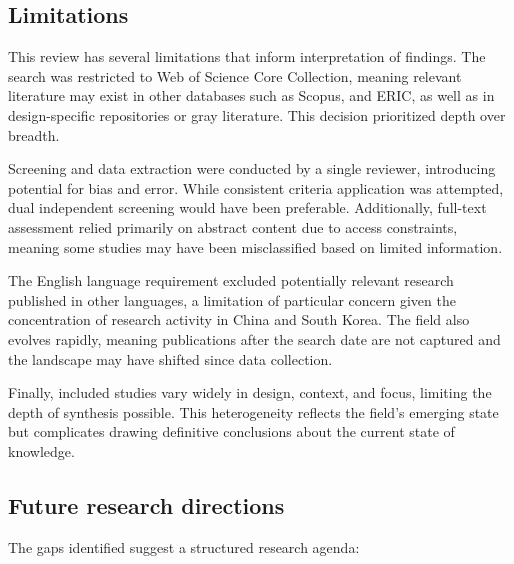 \documentclass[ed]{acnsart}
\begin{document}
\subsection{Limitations}
\label{sec:limitations}

This review has several limitations that inform interpretation of findings. The search was restricted to Web of Science Core Collection, meaning relevant literature may exist in other databases such as Scopus, and ERIC, as well as in design-specific repositories or gray literature. This decision prioritized depth over breadth.

Screening and data extraction were conducted by a single reviewer, introducing potential for bias and error. While consistent criteria application was attempted, dual independent screening would have been preferable. Additionally, full-text assessment relied primarily on abstract content due to access constraints, meaning some studies may have been misclassified based on limited information.

The English language requirement excluded potentially relevant research published in other languages, a limitation of particular concern given the concentration of research activity in China and South Korea. The field also evolves rapidly, meaning publications after the search date are not captured and the landscape may have shifted since data collection.

Finally, included studies vary widely in design, context, and focus, limiting the depth of synthesis possible. This heterogeneity reflects the field's emerging state but complicates drawing definitive conclusions about the current state of knowledge.

\subsection{Future research directions}

The gaps identified suggest a structured research agenda:
\end{document}
